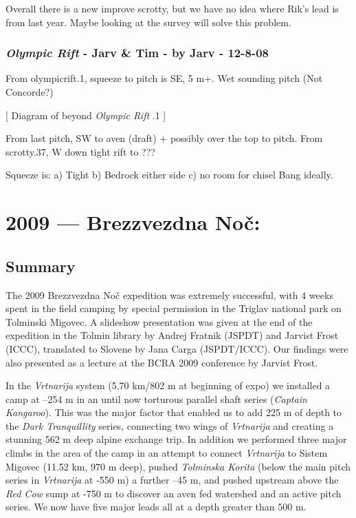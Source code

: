 Overall there is a new improve scrotty, but we have no idea where Rik's
lead is from last year. Maybe looking at the survey will solve this
problem.


\hypertarget{olympic-rift---jarv-tim---by-jarv---12-8-08}{%
\subsection{\texorpdfstring{\emph{Olympic Rift} - Jarv \& Tim - by Jarv
-
12-8-08}{Olympic Rift - Jarv \& Tim - by Jarv - 12-8-08}}\label{olympic-rift---jarv-tim---by-jarv---12-8-08}}

From olympicrift.1, squeeze to pitch is SE, 5 m+. Wet sounding pitch
(Not Concorde?)

{[} Diagram of beyond \emph{Olympic Rift} .1 {]}

From last pitch, SW to aven (draft) + possibly over the top to pitch.
From scrotty.37, W down tight rift to ???

Squeeze is: a) Tight b) Bedrock either side c) no room for chisel Bang
ideally.


\hypertarget{brezzvezdna-noux10d}{%
\chapter{2009 --- Brezzvezdna Noč:}\label{brezzvezdna-noux10d}}

\hypertarget{summary}{%
\section{Summary}\label{summary}}

The 2009 Brezzvezdna Noč expedition was extremely successful, with 4
weeks spent in the field camping by special permission in the Triglav
national park on Tolminski Migovec. A slideshow presentation was given
at the end of the expedition in the Tolmin library by Andrej Fratnik
(JSPDT) and Jarvist Frost (ICCC), translated to Slovene by Jana Carga
(JSPDT/ICCC). Our findings were also presented as a lecture at the BCRA
2009 conference by Jarvist Frost.

In the \emph{Vrtnarija} system (5.70 km/802 m at beginning of expo) we
installed a camp at --254 m in an until now torturous parallel shaft
series (\emph{Captain Kangaroo}). This was the major factor that enabled
us to add 225 m of depth to the \emph{Dark Tranquillity} series,
connecting two wings of \emph{Vrtnarija} and creating a stunning 562 m
deep alpine exchange trip. In addition we performed three major climbs
in the area of the camp in an attempt to connect \emph{Vrtnarija} to
Sistem Migovec (11.52 km, 970 m deep), pushed \emph{Tolminska Korita}
(below the main pitch series in \emph{Vrtnarija} at -550 m) a further
--45 m, and pushed upstream above the \emph{Red Cow} sump at -750 m to
discover an aven fed watershed and an active pitch series. We now have
five major leads all at a depth greater than 500 m.

